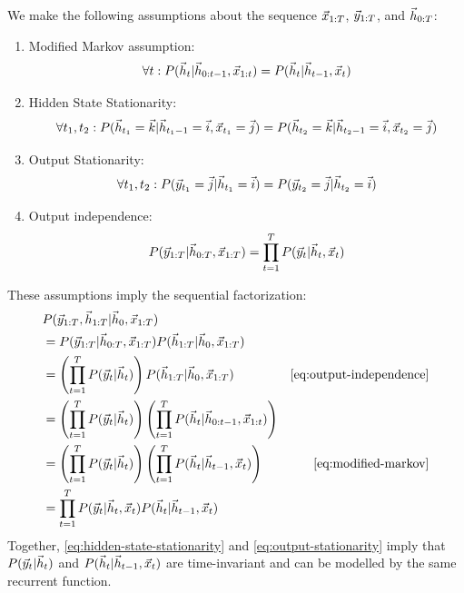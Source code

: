 We make the following assumptions about the sequence $\vec{x}_{1:T}$, $\vec{y}_{1:T}$, and $\vec{h}_{0:T}$:
\begin{enumerate}
  \item Modified Markov assumption:
    \begin{equation}
      \label{eq:modified-markov}
      \forall t: P(\vec{h}_t | \vec{h}_{0:t-1}, \vec{x}_{1:t}) = P(\vec{h}_t | \vec{h}_{t-1}, \vec{x}_t)
    \end{equation}
  \item Hidden State Stationarity:
    \begin{equation}
      \label{eq:hidden-state-stationarity}
      \forall t_1, t_2: P(\vec{h}_{t_1} = \vec{k} | \vec{h}_{t_{1}-1} = \vec{i}, \vec{x}_{t_1} = \vec{j}) = P(\vec{h}_{t_2} = \vec{k} | \vec{h}_{t_{2}-1} = \vec{i}, \vec{x}_{t_2} = \vec{j})
   \end{equation}
  \item Output Stationarity:
    \begin{equation}
      \label{eq:output-stationarity}
      \forall t_1, t_2: P(\vec{y}_{t_1} = \vec{j} | \vec{h}_{t_1} = \vec{i}) = P(\vec{y}_{t_2} = \vec{j} | \vec{h}_{t_2} = \vec{i})
   \end{equation}
  \item Output independence:
   \begin{equation}
     \label{eq:output-independence}
     P(\vec{y}_{1:T} | \vec{h}_{0:T}, \vec{x}_{1:T}) = \prod_{t=1}^T P(\vec{y}_t | \vec{h}_{t}, \vec{x}_t)
   \end{equation}
\end{enumerate}

These assumptions imply the sequential factorization:
\begin{align}
  &P(\y_{1:T}, \h_{1:T} | \h_0, \x_{1:T})  &\\
  &= P(\y_{1:T} | \h_{0:T}, \x_{1:T}) P(\h_{1:T} | \h_0, \x_{1:T})  &\\
  &= \left( \prod_{t=1}^T P(\y_t | \h_t) \right) P(\h_{1:T}| \h_0, \x_{1:T}) &\text{\cref{eq:output-independence}}\\
  &= \left( \prod_{t=1}^T P(\y_t | \h_t) \right) \left(\prod_{t=1}^T P(\h_{t}| \h_{0:t-1}, \x_{1:t})\right) &\\
  &= \left( \prod_{t=1}^T P(\y_t | \h_t) \right) \left(\prod_{t=1}^T P(\h_{t}| \h_{t-1}, \x_{t})\right) &\text{\cref{eq:modified-markov}}\\
  &= \prod_{t=1}^T P(\y_t | \h_t, \x_t) P(\h_{t}| \h_{t-1}, \x_{t}) & \\
\end{align}
Together, \cref{eq:hidden-state-stationarity} and \cref{eq:output-stationarity} imply that $P(\vec{y}_t | \vec{h}_t)$
and $P(\vec{h}_{t}| \vec{h}_{t-1}, \vec{x}_{t})$ are time-invariant and can be modelled by the same recurrent function.

